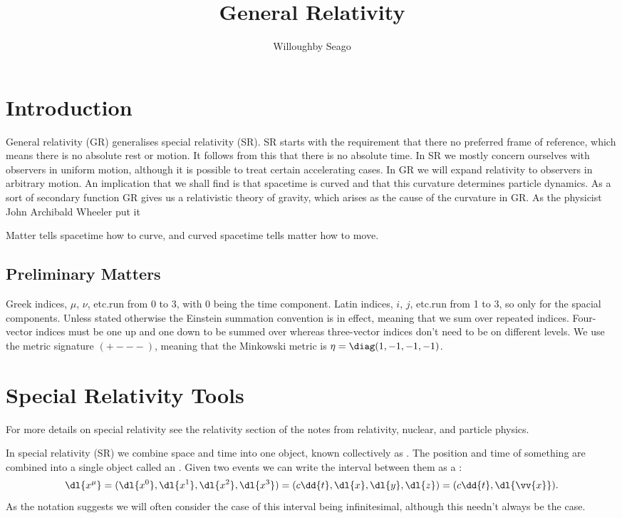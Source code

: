 \documentclass[fleqn]{NotesClass}
\title{General Relativity}
\author{Willoughby Seago}
\date{}
\begin{document}
    \frontmatter
    \titlepage
    \innertitlepage{} 
    \tableofcontents
    \mainmatter
    \chapter{Introduction}
    General relativity (GR) generalises special relativity (SR).
    SR starts with the requirement that there no preferred frame of reference, which means there is no absolute rest or motion.
    It follows from this that there is no absolute time.
    In SR we mostly concern ourselves with observers in uniform motion, although it is possible to treat certain accelerating cases.
    In GR we will expand relativity to observers in arbitrary motion.
    An implication that we shall find is that spacetime is curved and that this curvature determines particle dynamics.
    As a sort of secondary function GR gives us a relativistic theory of gravity, which arises as the cause of the curvature in GR.
    As the physicist John Archibald Wheeler put it
    \begin{displayquote}
        Matter tells spacetime how to curve, and curved spacetime tells matter how to move.
    \end{displayquote}

    \section{Preliminary Matters}
    Greek indices, \(\mu\), \(\nu\), etc.\@ run from 0 to 3, with 0 being the time component.
    Latin indices, \(i\), \(j\), etc.\@ run from 1 to 3, so only for the spacial components.
    Unless stated otherwise the Einstein summation convention is in effect, meaning that we sum over repeated indices.
    Four-vector indices must be one up and one down to be summed over whereas three-vector indices don't need to be on different levels.
    We use the metric signature \(({+}{-}{-}{-})\), meaning that the Minkowski metric is \(\eta = \diag(1, -1, -1, -1)\).
    
    \chapter{Special Relativity Tools}
    \begin{rmk}
        For more details on special relativity see the relativity section of the notes from relativity, nuclear, and particle physics.
    \end{rmk}
    In special relativity (SR) we combine space and time into one object, known collectively as .
    The position and time of something are combined into a single object called an .
    Given two events we can write the interval between them as a  :
    \begin{equation}
        \dl{x^\mu} = (\dl{x^0}, \dl{x^1}, \dl{x^2}, \dl{x^3}) = (c \dd{t}, \dl{x}, \dl{y}, \dl{z}) = (c\dd{t}, \dl{\vv{x}}).
    \end{equation}
    As the notation suggests we will often consider the case of this interval being infinitesimal, although this needn't always be the case.
    
\end{document}

